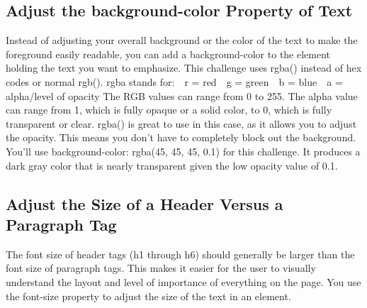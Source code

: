 \documentclass{article}%
\begin{document}
%
\subsection{Adjust the background{-}color Property of Text}%
\label{subsec:Adjustthebackground{-}colorPropertyofText}%
Instead of adjusting your overall background or the color of the text to make the foreground easily readable, you can add a background{-}color to the element holding the text you want to emphasize. This challenge uses rgba() instead of hex codes or normal rgb().\newline%
rgba stands for:~~r = red~~g = green~~b = blue~~a = alpha/level of opacity\newline%
The RGB values can range from 0 to 255. The alpha value can range from 1, which is fully opaque or a solid color, to 0, which is fully transparent or clear. rgba() is great to use in this case, as it allows you to adjust the opacity. This means you don't have to completely block out the background.\newline%
You'll use background{-}color: rgba(45, 45, 45, 0.1) for this challenge. It produces a dark gray color that is nearly transparent given the low opacity value of 0.1.\newline%

%
\subsection{Adjust the Size of a Header Versus a Paragraph Tag}%
\label{subsec:AdjusttheSizeofaHeaderVersusaParagraphTag}%
The font size of header tags (h1 through h6) should generally be larger than the font size of paragraph tags. This makes it easier for the user to visually understand the layout and level of importance of everything on the page. You use the font{-}size property to adjust the size of the text in an element.\newline%

%
\end{document}

